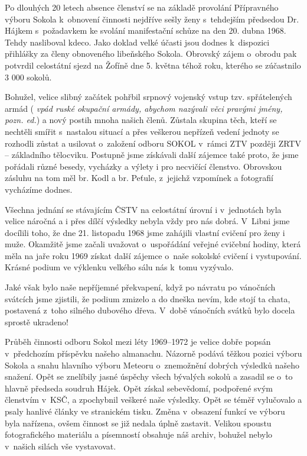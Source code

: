 \documentclass[a5paper, 11pt, twoside]{article}
\newcommand{\pozned}[1]{%
\textit{#1}}
\begin{document}
Po dlouhých 20 letech absence členství se na základě provolání
Přípravného výboru Sokola k~obnovení činnosti nejdříve sešly ženy
s~tehdejším předsedou Dr. Hájkem s~požadavkem ke svolání manifestační
schůze na den 20. dubna 1968. Tehdy nasliboval kdeco. Jako doklad velké
účasti jsou dodnes k~dispozici přihlášky za členy obnoveného libeňského
Sokola. Obrovský zájem o~obrodu pak potvrdil celostátní sjezd na Žofíně
dne 5. května téhož roku, kterého se zúčastnilo 3 000 sokolů.

Bohužel, velice slibný začátek pohřbil srpnový vojenský vstup tzv.
spřátelených armád (\pozned{vpád ruské okupační armády, abychom nazývali
věci pravými jmény, pozn. ed.}) a nový postih mnoha našich členů.
Zůstala skupina těch, kteří se nechtěli smířit s~nastalou situací a přes
veškerou nepřízeň vedení jednoty se rozhodli zůstat a usilovat
o~založení odboru SOKOL v~rámci ZTV později ZRTV -- základního tělocviku.
Postupně jsme získávali další zájemce také proto, že jsme pořádali různé
besedy, vycházky a výlety i pro necvičící členstvo. Obrovskou zásluhu na
tom měl br. Kodl a br. Peťule, z~jejichž vzpomínek a fotografií
vycházíme dodnes.

Všechna jednání se stávajícím ČSTV na celostátní úrovní i v~jednotách
byla velice náročná a i přes dílčí výsledky nebyla vždy pro nás dobrá.
V~Libni jsme docílili toho, že dne 21. listopadu 1968 jsme zahájili
vlastní cvičení pro ženy i muže. Okamžitě jsme začali uvažovat
o~uspořádání veřejné cvičební hodiny, která měla na jaře roku 1969 získat
další zájemce o~naše sokolské cvičení i vystupování. Krásné podium ve
výklenku velkého sálu nás k~tomu vyzývalo.

Jaké však bylo naše nepříjemné překvapení, když po návratu po vánočních
svátcích jsme zjistili, že podium zmizelo a do dneška nevím, kde stojí
ta chata, postavená z~toho silného dubového dřeva. V~době vánočních
svátků bylo docela sprostě ukradeno!

Průběh činnosti odboru Sokol mezi léty 1969--1972 je velice
dobře popsán v~předchozím příspěvku našeho almanachu. Názorně podává
těžkou pozici výboru Sokola a snahu hlavního výboru Meteoru o~znemožnění
dobrých výsledků našeho snažení. Opět se znelíbily jasné úspěchy všech
bývalých sokolů a zasadil se o~to hlavně předseda soudruh Hájek. Opět
získal sebevědomí, podpořené svým členstvím v~KSČ, a zpochybnil veškeré
naše výsledky. Opět se téměř vylučovalo a psaly hanlivé články ve
stranickém tisku. Změna v~obsazení funkcí ve výboru byla nařízena, ovšem
činnost se již nedala úplně zastavit. Velikou spoustu fotografického
materiálu a písemností obsahuje náš archiv, bohužel nebylo v~našich
silách vše vystavovat.
\end{document}
